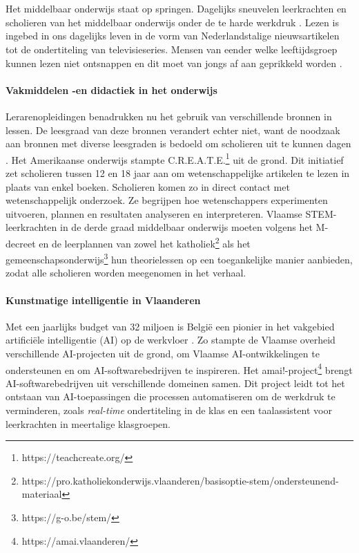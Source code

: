
\chapter{}%
\label{ch:inleiding}


Het middelbaar onderwijs staat op springen. Dagelijks sneuvelen leerkrachten en scholieren van het middelbaar onderwijs onder de te harde werkdruk \autocite{Glorieux2018}. Lezen is ingebed in ons dagelijks leven in de vorm van Nederlandstalige nieuwsartikelen tot de ondertiteling van televisieseries. Mensen van eender welke leeftijdsgroep kunnen lezen niet ontsnappen en dit moet van jongs af aan geprikkeld worden \autocite{Daoud2023}.

\subsubsection{Vakmiddelen -en didactiek in het onderwijs}
Lerarenopleidingen benadrukken nu het gebruik van verschillende bronnen in lessen. De leesgraad van deze bronnen verandert echter niet, want de noodzaak aan bronnen met diverse leesgraden is bedoeld om scholieren uit te kunnen dagen \autocite{Surma2019}. Het Amerikaanse onderwijs stampte C.R.E.A.T.E.\footnote{https://teachcreate.org/} uit de grond. Dit initiatief zet scholieren tussen 12 en 18 jaar aan om wetenschappelijke artikelen te lezen in plaats van enkel boeken. Scholieren komen zo in direct contact met wetenschappelijk onderzoek. Ze begrijpen hoe wetenschappers experimenten uitvoeren, plannen en resultaten analyseren en interpreteren. Vlaamse STEM-leerkrachten in de derde graad middelbaar onderwijs moeten volgens het M-decreet en de leerplannen van zowel het katholiek\footnote{https://pro.katholiekonderwijs.vlaanderen/basisoptie-stem/ondersteunend-materiaal} als het gemeenschapsonderwijs\footnote{https://g-o.be/stem/} hun theorielessen op een toegankelijke manier aanbieden, zodat alle scholieren worden meegenomen in het verhaal. 

\subsubsection{Kunstmatige intelligentie in Vlaanderen}
Met een jaarlijks budget van 32 miljoen is België een pionier in het vakgebied artificiële intelligentie (AI) op de werkvloer \autocite{Crevits2022}.  Zo stampte de Vlaamse overheid verschillende AI-projecten uit de grond, om Vlaamse AI-ontwikkelingen te ondersteunen en om AI-softwarebedrijven te inspireren. Het amai!-project\footnote{https://amai.vlaanderen/}  brengt AI-softwarebedrijven uit verschillende domeinen samen. Dit project leidt tot het ontstaan van AI-toepassingen die processen automatiseren om de werkdruk te verminderen, zoals \textit{real-time} ondertiteling in de klas en een taalassistent voor leerkrachten in meertalige klasgroepen.

